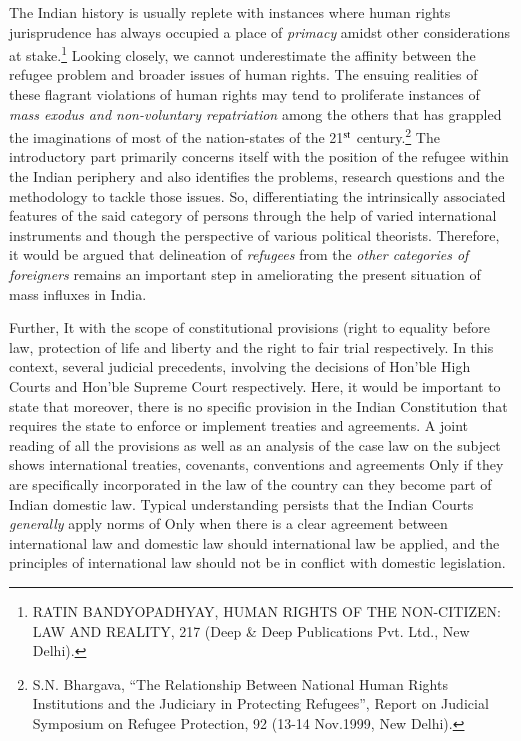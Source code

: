 \begin{multicols}{2}
\noi
The Indian history is usually replete with instances where human rights jurisprudence has
always occupied a place of \textit{primacy} amidst other considerations at stake.\footnote{RATIN BANDYOPADHYAY, HUMAN RIGHTS OF THE NON-CITIZEN: LAW AND REALITY, 217 (Deep \& Deep Publications Pvt. Ltd., New Delhi).} Looking closely, we cannot underestimate the affinity between the refugee problem and broader issues of human rights. The ensuing realities of these flagrant violations of human rights may tend to
proliferate instances of \textit{mass exodus and non-voluntary repatriation} among the others that has
grappled the imaginations of most of the nation-states of the 21$^{\rm st}$ century.\footnote{S.N. Bhargava, “The Relationship Between National Human Rights Institutions and the Judiciary in Protecting Refugees”, Report on Judicial Symposium on Refugee Protection, 92 (13-14 Nov.1999, New Delhi).} The introductory
part primarily concerns itself with the position of the refugee within the Indian periphery and
also identifies the problems, research questions and the methodology to tackle those issues.
So, differentiating the intrinsically associated features of the said category of persons through
the help of varied international instruments and though the perspective of various political
theorists. Therefore, it would be argued that delineation of \textit{refugees} from the \textit{other categories
of foreigners} remains an important step in ameliorating the present situation of mass influxes
in India.


\newpage

\noi
Further, It with the scope of constitutional provisions (right to equality before law, protection
of life and liberty and the right to fair trial respectively. In this context, several judicial
precedents, involving the decisions of Hon’ble High Courts and Hon’ble Supreme Court
respectively. Here, it would be important to state that moreover, there is no specific provision
in the Indian Constitution that requires the state to enforce or implement treaties and
agreements. A joint reading of all the provisions as well as an analysis of the case law on the
subject shows international treaties, covenants, conventions and agreements Only if they are
specifically incorporated in the law of the country can they become part of Indian domestic
law. Typical understanding persists that the Indian Courts \textit{generally} apply norms of Only
when there is a clear agreement between international law and domestic law should
international law be applied, and the principles of international law should not be in conflict
with domestic legislation.


\end{multicols}

